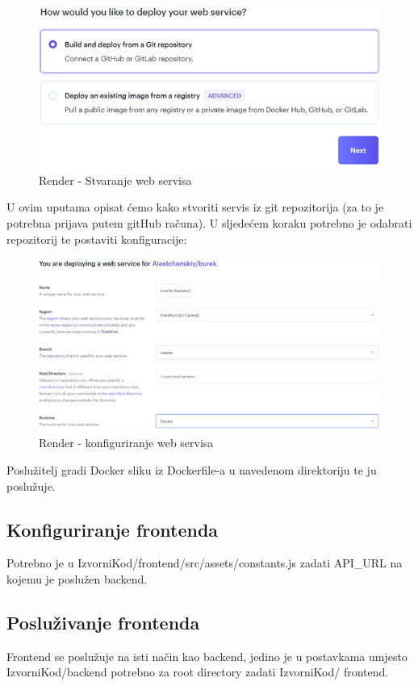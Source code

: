 \begin{figure}[H]
	\includegraphics[scale=0.4]{slike/render_backend.png}
	\centering
	\caption{Render - Stvaranje web servisa}
	\label{fig:render_backend1}
\end{figure}

U ovim uputama opisat ćemo kako stvoriti servis iz git repozitorija (za to je 
potrebna prijava putem gitHub računa). U sljedećem koraku potrebno je odabrati 
repozitorij te postaviti konfiguracije:

\begin{figure}[H]
	\includegraphics[scale=0.4]{slike/render_backend1.png}
	\centering
	\caption{Render - konfiguriranje web servisa}
	\label{fig:render_backend2}
\end{figure}

Poslužitelj gradi Docker sliku iz Dockerfile-a u navedenom direktoriju te ju 
poslužuje.

\subsection{Konfiguriranje frontenda}

Potrebno je u IzvorniKod/frontend/src/assets/constants.js zadati API_URL na 
kojemu je poslužen backend.

\subsection{Posluživanje frontenda}

Frontend se poslužuje na isti način kao backend, jedino je u postavkama 
umjesto IzvorniKod/backend potrebno za root directory zadati IzvorniKod/
frontend.

\eject 